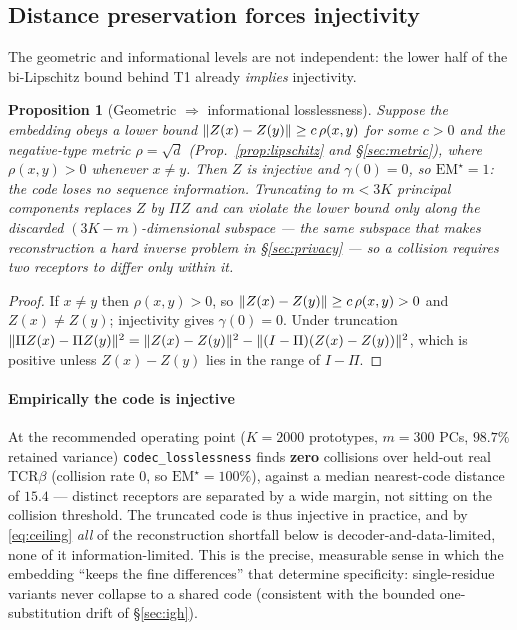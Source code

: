 \documentclass[11pt]{article}
\theoremstyle{oldplain}
\newtheorem{proposition}{Proposition}
\theoremstyle{oldrem}
\newcommand{\code}[1]{\texttt{#1}}
\DeclarePairedDelimiter{\norm}{\lVert}{\rVert}
\begin{document}
\subsection{Distance preservation forces injectivity}\label{sec:loss-inject}

The geometric and informational levels are not independent: the lower half of the bi-Lipschitz
bound behind T1 already \emph{implies} injectivity.

\begin{proposition}[Geometric $\Rightarrow$ informational losslessness]\label{prop:inject}
Suppose the embedding obeys a lower bound $\norm{Z(x)-Z(y)}\ge c\,\rho(x,y)$ for some $c>0$ and
the negative-type metric $\rho=\sqrt d$ (Prop.~\ref{prop:lipschitz} and \S\ref{sec:metric}), where
$\rho(x,y)>0$ whenever $x\neq y$. Then $Z$ is injective and $\gamma(0)=0$, so $\mathrm{EM}^\star=1$:
the code loses no sequence information. Truncating to $m<3K$ principal components replaces $Z$ by
$\Pi Z$ and can violate the lower bound only along the discarded $(3K-m)$-dimensional subspace ---
the same subspace that makes reconstruction a hard inverse problem in \S\ref{sec:privacy} --- so a
collision requires two receptors to differ \emph{only} within it.
\end{proposition}
\begin{proof}
If $x\neq y$ then $\rho(x,y)>0$, so $\norm{Z(x)-Z(y)}\ge c\,\rho(x,y)>0$ and $Z(x)\neq Z(y)$;
injectivity gives $\gamma(0)=0$. Under truncation $\norm{\Pi Z(x)-\Pi Z(y)}^2=\norm{Z(x)-Z(y)}^2-
\norm{(I-\Pi)(Z(x)-Z(y))}^2$, which is positive unless $Z(x)-Z(y)$ lies in the range of $I-\Pi$.
\end{proof}

\paragraph{Empirically the code is injective} At the recommended operating point
($K=2000$ prototypes, $m=300$ PCs, $98.7\%$ retained variance) \code{codec\_losslessness} finds
\textbf{zero} collisions over held-out real {\scshape TCR}$\beta$ (collision rate $0$, so
$\mathrm{EM}^\star=100\%$), against a median nearest-code distance of $15.4$ --- distinct receptors
are separated by a wide margin, not sitting on the collision threshold. The truncated code is thus
injective in practice, and by \eqref{eq:ceiling} \emph{all} of the reconstruction shortfall below
is decoder-and-data-limited, none of it information-limited. This is the precise, measurable sense
in which the embedding ``keeps the fine differences'' that determine specificity: single-residue
variants never collapse to a shared code (consistent with the bounded one-substitution drift of
\S\ref{sec:igh}).
\end{document}
